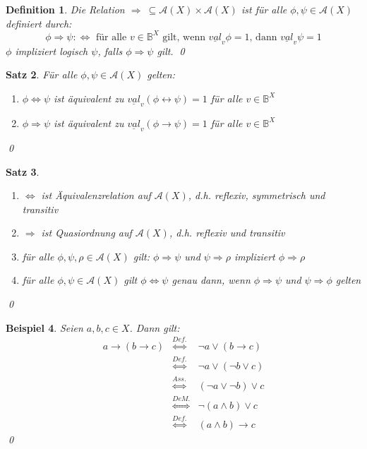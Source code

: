 \documentclass[ngerman]{scrartcl}
\theoremstyle{custom}
\newtheorem{mdef}{Definition} \numberwithin{mdef}{subsection}
\newtheorem{mex}[mdef]{Beispiel}
\newtheorem{ms}[mdef]{Satz}
\newcommand{\ax}{\mathcal{A}(X)}
\newcommand{\val}{\underline{val}_v}
\newcommand{\0}{\mathbf{0}}
\newcommand{\1}{\mathbf{L}}
\begin{document}
\begin{mdef}
Die Relation $\Rightarrow ~ \subseteq \ax \times \ax$ ist f\"ur alle
$\phi, \psi \in \ax$ definiert durch:\\
\begin{equation*}
\phi \Rightarrow \psi :\Longleftrightarrow \text{ f\"ur alle } v \in
\mathds{B}^X \text{ gilt, wenn } \val{\phi}=1 \text{, dann }
\val{\psi}=1
\end{equation*}
$\phi$ \emph{impliziert logisch} $\psi$, falls $\phi
\Rightarrow \psi$ gilt. \qed
\end{mdef}

\begin{ms} F\"ur alle $\phi, \psi \in \ax$ gelten:
\begin{enumerate} 
\item $\phi \Leftrightarrow \psi$ ist \"aquivalent zu $\val(\phi
  \leftrightarrow \psi)=1$ f\"ur alle $v \in \mathds{B}^X$
\item $\phi \Rightarrow \psi$ ist \"aquivalent zu $\val(\phi
  \rightarrow \psi) = 1$ f\"ur alle $v \in \mathds{B}^X$
\end{enumerate}
\qed
\end{ms}

\begin{ms}
\begin{enumerate}
\item $\Leftrightarrow$ ist \"Aquivalenzrelation auf $\ax$,
  d.h. reflexiv, symmetrisch und transitiv
\item $\Rightarrow$ ist Quasiordnung auf $\ax$, d.h. reflexiv und
  transitiv
\item f\"ur alle $\phi, \psi, \rho \in \ax$ gilt: $\phi \Rightarrow
  \psi$ und $\psi \Rightarrow \rho$ impliziert $\phi \Rightarrow \rho$
\item f\"ur alle $\phi, \psi \in \ax$ gilt $\phi \Leftrightarrow \psi$
  genau dann, wenn $\phi \Rightarrow \psi$ und $\psi \Rightarrow \phi$
  gelten
\end{enumerate}
\qed
\end{ms}

\begin{mex}
Seien $a,b,c \in X$. Dann gilt:
\begin{eqnarray*}
a \rightarrow (b \rightarrow c) &\stackrel{Def.}{\Leftrightarrow}& \neg a \vee (b
\rightarrow c) \\
&\stackrel{Def.}{\Leftrightarrow}& \neg a \vee (\neg b \vee c)\\
&\stackrel{Ass.}{\Leftrightarrow}& (\neg a \vee \neg b) \vee c \\
&\stackrel{De M.}{\Leftrightarrow}& \neg (a \wedge b) \vee c \\
&\stackrel{Def.}{\Leftrightarrow}& (a \wedge b) \rightarrow c
\end{eqnarray*}
\qed
\end{mex}
\end{document}
